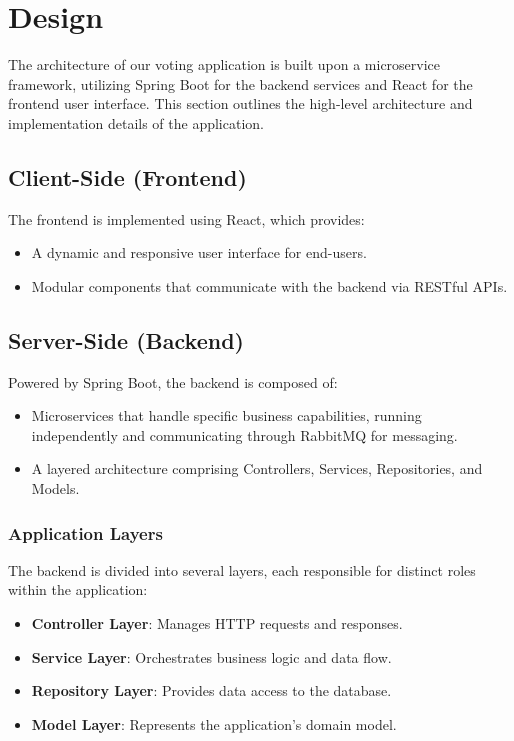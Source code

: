 \section{Design}
\label{sec:design}

The architecture of our voting application is built upon a microservice framework, utilizing Spring Boot for the backend services and React for the frontend user interface. This section outlines the high-level architecture and implementation details of the application.

\subsection{Client-Side (Frontend)}
The frontend is implemented using React, which provides:
\begin{itemize}
  \item A dynamic and responsive user interface for end-users.
  \item Modular components that communicate with the backend via RESTful APIs.
\end{itemize}

\subsection{Server-Side (Backend)}
Powered by Spring Boot, the backend is composed of:
\begin{itemize}
  \item Microservices that handle specific business capabilities, running independently and communicating through RabbitMQ for messaging.
  \item A layered architecture comprising Controllers, Services, Repositories, and Models.
\end{itemize}

\subsubsection{Application Layers}
The backend is divided into several layers, each responsible for distinct roles within the application:
\begin{itemize}
  \item \textbf{Controller Layer}: Manages HTTP requests and responses.
  \item \textbf{Service Layer}: Orchestrates business logic and data flow.
  \item \textbf{Repository Layer}: Provides data access to the database.
  \item \textbf{Model Layer}: Represents the application's domain model.
\end{itemize}

